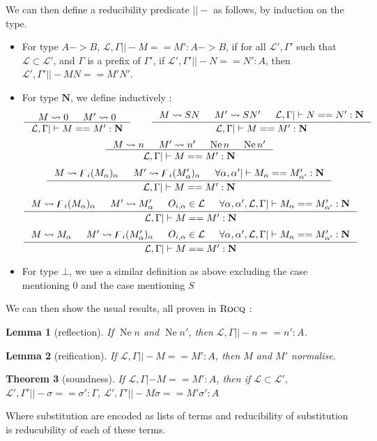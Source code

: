 \documentclass[11pt]{article}
\newtheorem{theorem}{Theorem}[section]
\newtheorem{lemma}[theorem]{Lemma}
\DeclareMathOperator{\neu}{Ne}
\newcommand{\0}{\mathbf{0}}
\newcommand{\1}{\mathbf{1}}
\newcommand{\nat}{\mathbf{N}}
\newcommand{\tctx}{\Gamma}
\newcommand{\fctx}{\mathcal{L}}
\begin{document}
We can then define a reducibility predicate $||-$ as follows, by induction on the type.
\begin{itemize}
    \item For type $A -> B$, $\fctx,\tctx ||- M == M' : A -> B$, if for all $\fctx',\tctx'$ such that $\fctx\subset\fctx'$, and $\tctx$ is a prefix of $\tctx'$, if $\fctx',\tctx' ||- N == N' : A$, then $\fctx', \tctx' ||- MN == M'N'$.
    \item For type $\nat$, we define inductively :
$$
    \inference{M \leadsto 0&M' \leadsto 0}{\fctx,\tctx ||- M == M' : \nat}\qquad
    \inference{M \leadsto SN&M' \leadsto SN' &\fctx,\tctx ||- N == N' : \nat}{\fctx,\tctx ||- M == M' : \nat}
$$
$$
    \inference{M \leadsto n&M' \leadsto n' &\neu n & \neu n'}{\fctx,\tctx ||- M == M' : \nat}
$$
$$
    \inference{M \leadsto \digamma_i (M_\alpha)_\alpha&M' \leadsto \digamma_i({M'_\alpha})_\alpha & \forall \alpha,\alpha' ||- M_\alpha == M'_{\alpha'} : \nat}{\fctx,\tctx ||- M == M' : \nat}
$$
$$
    \inference{M \leadsto \digamma_i(M_\alpha)_\alpha&M' \leadsto M'_\alpha & O_{i,\alpha}\in \fctx & \forall \alpha,\alpha', \fctx,\tctx ||- M_\alpha == M'_{\alpha'} : \nat}{\fctx,\tctx ||- M == M' : \nat}
$$
$$
    \inference{M \leadsto M_\alpha&M' \leadsto \digamma_i (M'_\alpha)_\alpha & O_{i,\alpha}\in \fctx & \forall \alpha,\alpha', \fctx,\tctx ||- M_\alpha == M'_{\alpha'} : \nat}{\fctx,\tctx ||- M == M' : \nat}
$$
    \item For type $\bot$, we use a similar definition as above excluding the case mentioning $0$ and the case mentioning $S$ 
\end{itemize}

We can then show the usual results, all proven in $\textsc{Rocq}$ :

\begin{lemma}[reflection]
    If $\neu n$ and $\neu n'$, then $\fctx,\tctx ||- n == n' : A$.
\end{lemma}
\begin{lemma}[reification]
    If $\fctx,\tctx ||- M == M' : A$, then $M$ and $M'$ normalise.
\end{lemma}

\begin{theorem}[soundness]
    If $\fctx,\tctx |- M == M' : A$, then if $\fctx \subset \fctx'$, $\fctx',\tctx'||-\sigma == \sigma' : \Gamma$, $\fctx',\tctx' ||- M\sigma == M'\sigma' : A$
\end{theorem}
Where substitution are encoded as lists of terms and reducibility of substitution is reducubility of each of these terms.
\end{document}
